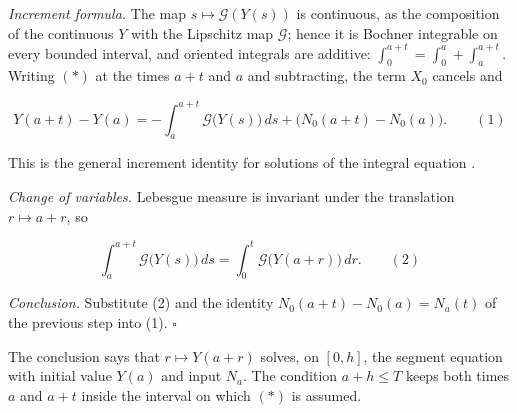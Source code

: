 \documentclass[11pt,a4paper]{article}
\begin{document}
\emph{Increment formula.} The map \(s\mapsto\mathcal G(Y(s))\) is continuous, as the composition of the continuous \(Y\) with the Lipschitz map \(\mathcal G\); hence it is Bochner integrable on every bounded interval, and oriented integrals are additive: \(\int_0^{a+t}=\int_0^a+\int_a^{a+t}\). Writing \((\ast)\) at the times \(a+t\) and \(a\) and subtracting, the term \(X_0\) cancels and


\[Y(a+t)-Y(a)=-\int_a^{a+t}\mathcal G\bigl(Y(s)\bigr)\,ds+\bigl(N_0(a+t)-N_0(a)\bigr).\qquad(1)\]


This is the general increment identity for solutions of the integral equation \cite[Section~3.16.4]{LangevinLean2026ULASC}.




\emph{Change of variables.} Lebesgue measure is invariant under the translation \(r\mapsto a+r\), so


\[\int_a^{a+t}\mathcal G\bigl(Y(s)\bigr)\,ds=\int_0^t\mathcal G\bigl(Y(a+r)\bigr)\,dr.\qquad(2)\]


\emph{Conclusion.} Substitute (2) and the identity \(N_0(a+t)-N_0(a)=N_a(t)\) of the previous step into (1). \(\square\)




The conclusion says that \(r\mapsto Y(a+r)\) solves, on \([0,h]\), the segment equation with initial value \(Y(a)\) and input \(N_a\). The condition \(a+h\le T\) keeps both times \(a\) and \(a+t\) inside the interval on which \((\ast)\) is assumed.
\end{document}
